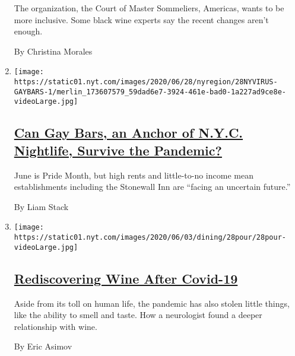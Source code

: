 \begin{enumerate}
  The organization, the Court of Master Sommeliers, Americas, wants to
  be more inclusive. Some black wine experts say the recent changes
  aren't enough.

  By Christina Morales
\item
  \texttt{[image: https://static01.nyt.com/images/2020/06/28/nyregion/28NYVIRUS-GAYBARS-1/merlin\_173607579\_59dad6e7-3924-461e-bad0-1a227ad9ce8e-videoLarge.jpg]}

  \hypertarget{can-gay-bars-an-anchor-of-nyc-nightlife-survive-the-pandemic}{%
  \subsection{\texorpdfstring{\href{/2020/06/20/nyregion/nyc-gay-bars-pride.html}{Can
  Gay Bars, an Anchor of N.Y.C. Nightlife, Survive the
  Pandemic?}}{Can Gay Bars, an Anchor of N.Y.C. Nightlife, Survive the Pandemic?}}\label{can-gay-bars-an-anchor-of-nyc-nightlife-survive-the-pandemic}}

  June is Pride Month, but high rents and little-to-no income mean
  establishments including the Stonewall Inn are ``facing an uncertain
  future.''

  By Liam Stack
\item
  \texttt{[image: https://static01.nyt.com/images/2020/06/03/dining/28pour/28pour-videoLarge.jpg]}

  \hypertarget{rediscovering-wine-after-covid-19}{%
  \subsection{\texorpdfstring{\href{/2020/05/28/dining/drinks/wine-coronavirus-sense-of-smell.html}{Rediscovering
  Wine After
  Covid-19}}{Rediscovering Wine After Covid-19}}\label{rediscovering-wine-after-covid-19}}

  Aside from its toll on human life, the pandemic has also stolen little
  things, like the ability to smell and taste. How a neurologist found a
  deeper relationship with wine.

  By Eric Asimov
\end{enumerate}

